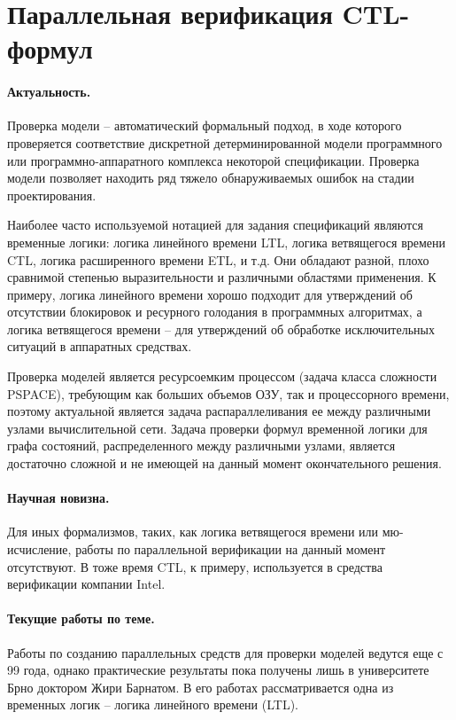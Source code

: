 \documentclass[a4paper,12pt,notitlepage]{article}
\begin{document}
\section{Параллельная верификация CTL-формул}
\label{sec:ctl-verification}

\paragraph{Актуальность.}
Проверка модели -- автоматический формальный подход, в ходе которого проверяется
соответствие дискретной детерминированной модели программного или программно-аппаратного
комплекса некоторой спецификации. Проверка модели позволяет находить ряд тяжело
обнаруживаемых ошибок на стадии проектирования.

Наиболее часто используемой нотацией для задания спецификаций являются временные логики:
логика линейного времени LTL, логика ветвящегося времени CTL, логика расширенного времени
ETL, и т.д. Они обладают разной, плохо сравнимой степенью выразительности и различными
областями применения. К примеру, логика линейного времени хорошо подходит для утверждений
об отсутствии блокировок и ресурного голодания в программных алгоритмах, а логика
ветвящегося времени -- для утверждений об обработке исключительных ситуаций в аппаратных
средствах.

Проверка моделей является ресурсоемким процессом (задача класса сложности PSPACE),
требующим как больших объемов ОЗУ, так и процессорного времени, поэтому актуальной
является задача распараллеливания ее между различными узлами вычислительной сети. Задача
проверки формул временной логики для графа состояний, распределенного между различными
узлами, является достаточно сложной и не имеющей на данный момент окончательного
решения. 

\paragraph{Научная новизна.}
Для иных формализмов, таких, как логика ветвящегося времени или мю-исчисление, работы по
параллельной верификации на данный момент отсутствуют. В тоже время CTL, к примеру,
используется в средства верификации компании Intel.

\paragraph{Текущие работы по теме.}
Работы по созданию параллельных средств для проверки моделей ведутся еще с 99 года, однако
практические результаты пока получены лишь в университете Брно доктором Жири Барнатом. В
его работах рассматривается одна из временных логик -- логика линейного времени (LTL). 
\end{document}
